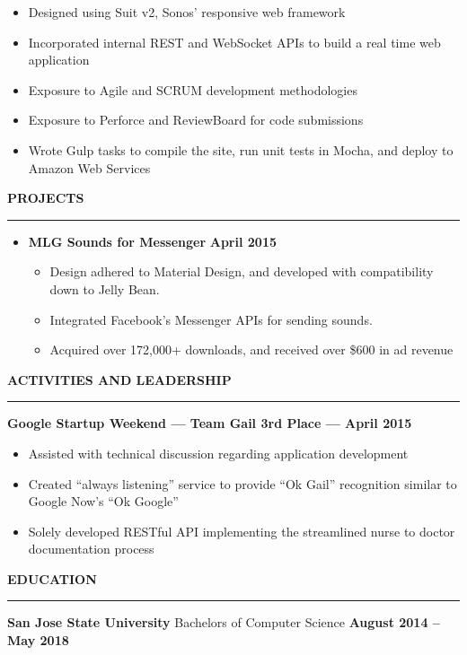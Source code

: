 \documentclass[10pt, oneside]{letter}
\newcommand{\linespaceshit} {
  \vspace{0.05in}
  \hrule
  \vspace{0.05in}
}
\begin{document}
\begin{adjustwidth}{0.1in}{0pt}
\begin{itemize}
\begin{itemize}
              \item Designed using Suit v2, Sonos' responsive web framework
              \item Incorporated internal REST and WebSocket APIs to build a real time web application
              \item Exposure to Agile and SCRUM development methodologies
              \item Exposure to Perforce and ReviewBoard for code submissions
              \item Wrote Gulp tasks to compile the site, run unit tests in Mocha, and deploy to Amazon Web Services
            \end{itemize}
      \end{itemize}

    \end{adjustwidth}

  \textbf{PROJECTS}
  \linespaceshit
    \begin{adjustwidth}{0.2in}{0pt}
      \begin{itemize}
        \item \textbf{MLG Sounds for Messenger} \hfill \textbf{April 2015}
          \begin{itemize}
            \item Design adhered to Material Design, and developed with compatibility down to Jelly Bean.
            \item Integrated Facebook's Messenger APIs for sending sounds.
            \item Acquired over 172,000+ downloads, and received over \$600 in ad revenue
          \end{itemize}
      \end{itemize}
    \end{adjustwidth}


  \textbf{ACTIVITIES AND LEADERSHIP}
  \linespaceshit
    \textbf{Google Startup Weekend --- Team Gail 3rd Place --- April 2015}
    \begin{adjustwidth}{0.2in}{0pt}
      \begin{itemize}
        \item Assisted with technical discussion regarding application development
        \item Created ``always listening'' service to provide ``Ok Gail'' recognition similar to Google Now's ``Ok Google''
        \item Solely developed RESTful API implementing the streamlined nurse to doctor documentation process
      \end{itemize}
    \end{adjustwidth}

  \textbf{EDUCATION}
  \linespaceshit
    \begin{adjustwidth}{0.1in}{0pt}
      \textbf{San Jose State University} \hfill Bachelors of Computer Science \hfill \textbf{August 2014 -- May 2018}
    \end{adjustwidth}
\end{document}
